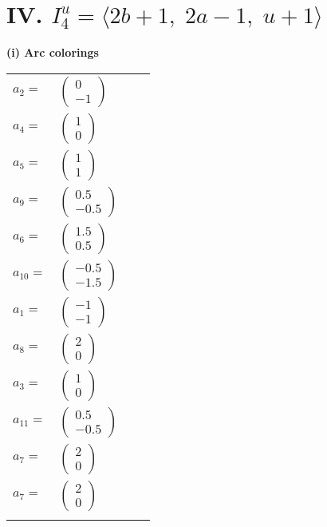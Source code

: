 \documentclass[1p]{elsarticle_modified}
\theoremstyle{definition}
\begin{document}
\centering \section*{IV. $I^u_{4}= \langle 2 b+1,\;2 a-1,\;u+1 \rangle$}
\flushleft \textbf{(i) Arc colorings}\\
\begin{tabular}{m{7pt} m{180pt} m{7pt} m{180pt} }
\flushright $a_{2}=$&$\begin{pmatrix}0\\-1\end{pmatrix}$ \\
\flushright $a_{4}=$&$\begin{pmatrix}1\\0\end{pmatrix}$ \\
\flushright $a_{5}=$&$\begin{pmatrix}1\\1\end{pmatrix}$ \\
\flushright $a_{9}=$&$\begin{pmatrix}0.5\\-0.5\end{pmatrix}$ \\
\flushright $a_{6}=$&$\begin{pmatrix}1.5\\0.5\end{pmatrix}$ \\
\flushright $a_{10}=$&$\begin{pmatrix}-0.5\\-1.5\end{pmatrix}$ \\
\flushright $a_{1}=$&$\begin{pmatrix}-1\\-1\end{pmatrix}$ \\
\flushright $a_{8}=$&$\begin{pmatrix}2\\0\end{pmatrix}$ \\
\flushright $a_{3}=$&$\begin{pmatrix}1\\0\end{pmatrix}$ \\
\flushright $a_{11}=$&$\begin{pmatrix}0.5\\-0.5\end{pmatrix}$ \\
\flushright $a_{7}=$&$\begin{pmatrix}2\\0\end{pmatrix}$\\ \flushright $a_{7}=$&$\begin{pmatrix}2\\0\end{pmatrix}$\\&\end{tabular}
\end{document}
